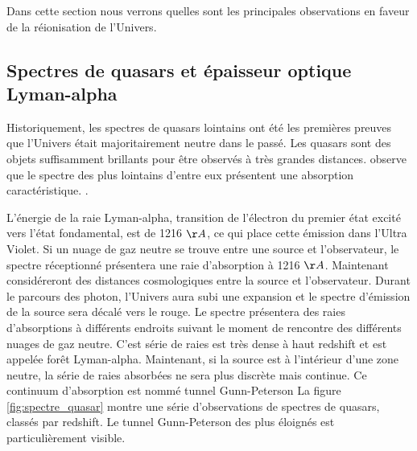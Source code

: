 Dans cette section nous verrons quelles sont les principales observations en faveur de la réionisation de l'Univers.

\subsection{Spectres de quasars et épaisseur optique Lyman-alpha}

Historiquement, les spectres de quasars lointains ont été les premières preuves que l'Univers était majoritairement neutre dans le passé.
Les quasars sont des objets suffisamment brillants pour être observés à très grandes distances.
\cite{1965ApJ...141.1295S} observe que le spectre des plus lointains d'entre eux présentent une absorption caractéristique.
.%

L'énergie de la raie Lyman-alpha, transition de l'électron du premier état excité vers l’état fondamental, est de 1216 $\AA$, ce qui place cette émission dans l'Ultra Violet.
Si un nuage de gaz neutre se trouve entre une source et l'observateur, le spectre réceptionné présentera une raie d'absorption à 1216 $\AA$.
Maintenant considéreront des distances cosmologiques entre la source et l'observateur.
Durant le parcours des photon, l'Univers aura subi une expansion et le spectre d'émission de la source sera décalé vers le rouge.
Le spectre présentera des raies d’absorptions à différents endroits suivant le moment de rencontre des différents nuages de gaz neutre.
C'est série de raies est très dense à haut redshift et est appelée forêt Lyman-alpha.
Maintenant, si la source est à l’intérieur d'une zone neutre, la série de raies absorbées ne sera plus discrète mais continue.
Ce continuum d’absorption est nommé tunnel Gunn-Peterson \citep{1965ApJ...141.1295S}
La figure \ref{fig:spectre_quasar} montre une série d'observations de spectres de quasars, classés par redshift.
Le tunnel Gunn-Peterson des plus éloignés est particulièrement visible.


